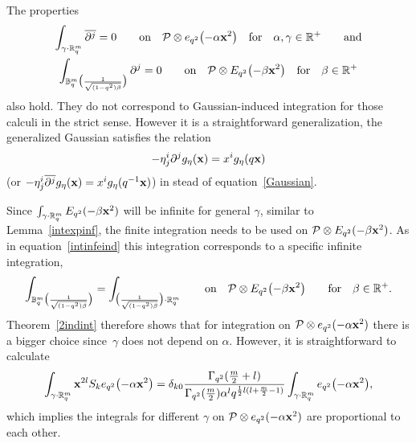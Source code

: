 \documentclass[11pt]{article}
\newcommand{\mR}{\mathbb{R}}
\newcommand{\mB}{\mathbb{B}}
\newcommand{\cP}{\mathcal{P}}
\numberwithin{equation}{section}
\begin{document}
\begin{remark}
\label{gengauss}
The properties
\begin{gather*}
\int_{\gamma\cdot\mR^m_q}\overline{\partial^j}=0\qquad \mbox{on}\quad  \cP\otimes e_{q^2}\big({-}\alpha\bold{x}^2\big)\quad \mbox{for}\quad \alpha,\gamma\in\mR^+\qquad\mbox{and}\\
\int_{\mB^m_q\big(\frac{1}{\sqrt{(1-q^2)\beta}}\big)}\partial^j=0\qquad \mbox{on}\quad \cP\otimes E_{q^2}\big({-}\beta\bold{x}^2\big)\quad\mbox{for}\quad\beta\in\mR^+
\end{gather*}
also hold. They do not correspond to Gaussian-induced integration for those calculi in the strict sense. However it is a straightforward generalization, the generalized Gaussian satisf\/ies the relation
\begin{gather*}
-\eta^i_{ j}\partial^jg_{\eta}(\bold{x}) = x^i g_\eta(q\bold{x})
\end{gather*}
(or $-\eta^i_{ j}\overline{\partial^j}g_{\eta}(\bold{x})=x^i g_\eta(q^{-1}\bold{x})$) in stead of equation~\eqref{Gaussian}.
\end{remark}

Since $\int_{\gamma\cdot\mR^m_q}E_{q^2}(-\beta\bold{x}^2)$ will be inf\/inite for general $\gamma$, similar to Lemma~\ref{intexpinf}, the f\/inite integration needs to be used on $\cP\otimes E_{q^2}(-\beta\bold{x}^2)$. As in equation~\eqref{intinfeind} this integration corresponds to a specif\/ic inf\/inite integration,
\begin{gather*}
\label{intbetainf}
\int_{\mB^m_q\big(\frac{1}{\sqrt{(1-q^2)\beta}}\big)} = \int_{\big(\frac{1}{\sqrt{(1-q^2)\beta}}\big)\cdot\mR^m_q}\qquad\mbox{on}\quad \cP\otimes E_{q^2}\big({-}\beta\bold{x}^2\big)\qquad\mbox{for}\quad\beta\in\mR^+.
\end{gather*}
Theorem~\ref{2indint} therefore shows that for integration on $\cP\otimes e_{q^2}(-\alpha\bold{x}^2)$ there is a bigger choice since~$\gamma$ does not depend on $\alpha$. However, it is straightforward to calculate
\begin{gather*}
\int_{\gamma\cdot\mR^m_q}\bold{x}^{2l}S_ke_{q^2}\big({-}\alpha\bold{x}^2\big)=
\delta_{k0}\frac{\Gamma_{q^2}(\frac{m}{2}+l)}{\Gamma_{q^2}(\frac{m}{2})\alpha^lq^{\frac{1}{2}l(l+\frac{m}{2}-1)}}
\int_{\gamma\cdot\mR^m_q}e_{q^2}\big({-}\alpha\bold{x}^2\big),
\end{gather*}
which implies the integrals for dif\/ferent $\gamma$ on $\cP\otimes e_{q^2}(-\alpha\bold{x}^2)$ are proportional to each other.
\end{document}

